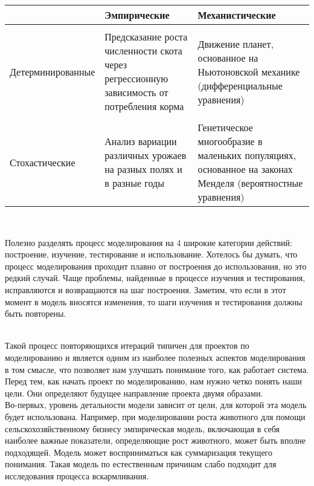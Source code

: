 \begin{center}
\begin{tabular}{p{} | p{} p{} }
& Эмпирические & Механистические \\
\hline \\
Детерминированные & Предсказание роста численности скота через регрессионную зависимость от потребления корма & Движение планет, основанное на Ньютоновской механике (дифференциальные уравнения) \\
& & \\
Стохастические & Анализ вариации различных урожаев на разных полях и в разные годы & Генетическое многообразие в маленьких популяциях, основанное на законах Менделя (вероятностные уравнения) \\
\end{tabular}
\end{center}
\

Полезно разделять процесс моделирования на 4 широкие категории действий: построение, изучение, тестирование и использование. Хотелось бы думать, что процесс моделирования проходит плавно от построения до использования, но это редкий случай. Чаще проблемы, найденные в процессе изучения и тестирования, исправляются и возвращаются на шаг построения. Заметим, что если в этот момент в модель вносятся изменения, то шаги изучения и тестирования должны быть повторены. \\

\

Такой процесс повторяющихся итераций типичен для проектов по моделированию и является одним из наиболее полезных аспектов моделирования в том смысле, что позволяет нам улучшать понимание того, как работает система. \\

Перед тем, как начать проект по моделированию, нам нужно четко понять наши цели. Они определяют будущее направление проекта двумя образами. \\

Во-первых, уровень детальности модели зависит от цели, для которой эта модель будет использована. Например, при моделировании роста животного для помощи сельскохозяйственному бизнесу эмпирическая модель, включающая в себя наиболее важные показатели, определяющие рост животного, может быть вполне подходящей. Модель может восприниматься как суммаризация текущего понимания. Такая модель по естественным причинам слабо подходит для исследования процесса вскармливания. \\

